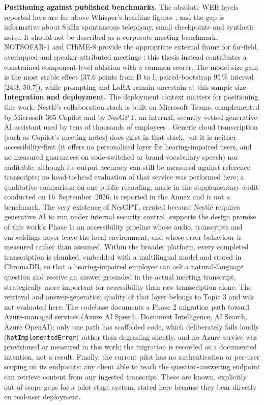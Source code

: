 \documentclass[12pt]{report}
\begin{document}
\textbf{Positioning against published benchmarks.} The absolute WER levels reported here are far above Whisper's headline figures \cite{radford2023robust}, and the gap is informative about 8\,kHz spontaneous telephony, small checkpoints and synthetic noise. It should not be described as a corporate-meeting benchmark. NOTSOFAR-1 and CHiME-8 provide the appropriate external frame for far-field, overlapped and speaker-attributed meetings \cite{vinnikov2024notsofar,cornell2024chime8}; this thesis instead contributes a constrained component-level ablation with a common scorer. The model-size gain is the most stable effect (37.6 points from B to I; paired-bootstrap 95\,\% interval [24.3, 50.7]), while prompting and LoRA remain uncertain at this sample size.
\textbf{Integration and deployment.} The deployment context matters for positioning this work: Nestl\'e's collaboration stack is built on Microsoft Teams, complemented by Microsoft 365 Copilot and by NesGPT, an internal, security-vetted generative-AI assistant used by tens of thousands of employees \cite{worklife2024nesgpt,arec2023nestle}. Generic cloud transcription (such as Copilot's meeting notes) does exist in that stack, but it is neither accessibility-first (it offers no personalised layer for hearing-impaired users, and no measured guarantees on code-switched or brand-vocabulary speech) nor auditable, although its output accuracy can still be measured against reference transcripts; no head-to-head evaluation of that service was performed here; a qualitative comparison on one public recording, made in the supplementary audit conducted on 16~September~2026, is reported in the Annex and is not a benchmark. The very existence of NesGPT, created because Nestl\'e requires generative AI to run under internal security control, supports the design premise of this work's Phase 1: an accessibility pipeline whose audio, transcripts and embeddings never leave the local environment, and whose error behaviour is measured rather than assumed. Within the broader platform, every completed transcription is chunked, embedded with a multilingual model and stored in ChromaDB, so that a hearing-impaired employee can ask a natural-language question and receive an answer grounded in the actual meeting transcript, strategically more important for accessibility than raw transcription alone. The retrieval and answer-generation quality of that layer belongs to Topic 3 and was not evaluated here. The codebase documents a Phase 2 migration path toward Azure-managed services (Azure AI Speech, Document Intelligence, AI Search, Azure OpenAI); only one path has scaffolded code, which deliberately fails loudly (\texttt{NotImplementedError}) rather than degrading silently, and no Azure service was provisioned or measured in this work; the migration is recorded as a documented intention, not a result. Finally, the current pilot has no authentication or per-user scoping on its endpoints: any client able to reach the question-answering endpoint can retrieve content from any ingested transcript. These are known, explicitly out-of-scope gaps for a pilot-stage system, stated here because they bear directly on real-user deployment.
\end{document}
